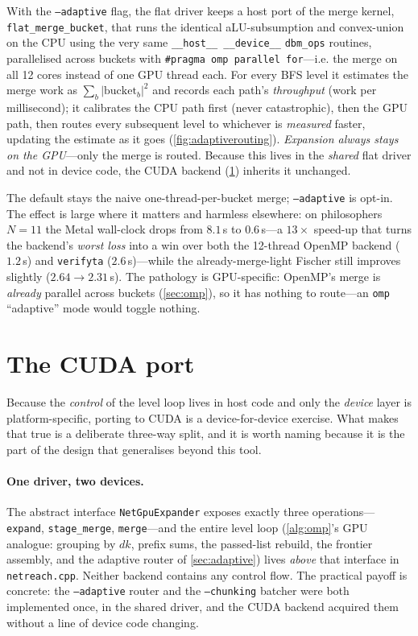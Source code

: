 \documentclass[11pt]{article}
\newcommand{\dk}{\ensuremath{\mathit{dk}}}
\newcommand{\code}[1]{\texttt{\small #1}}
\begin{document}
With the \code{--adaptive} flag, the flat driver keeps a host port of the merge kernel,
\code{flat\_merge\_bucket}, that runs the identical aLU-subsumption and convex-union on the CPU using
the very same \code{\_\_host\_\_ \_\_device\_\_} \code{dbm\_ops} routines, parallelised across buckets
with \code{\#pragma omp parallel for}---i.e. the merge on all 12 cores instead of one GPU thread each.
For every BFS level it estimates the merge work as $\sum_b |\mathrm{bucket}_b|^2$ and records each
path's \emph{throughput} (work per millisecond); it calibrates the CPU path first (never
catastrophic), then the GPU path, then routes every subsequent level to whichever is \emph{measured}
faster, updating the estimate as it goes (\cref{fig:adaptiverouting}). \emph{Expansion always stays on the GPU}---only the merge is
routed. Because this lives in the \emph{shared} flat driver and not in device code, the CUDA backend
(\cref{sec:cuda}) inherits it unchanged.

The default stays the naive one-thread-per-bucket merge; \code{--adaptive} is opt-in. The effect is
large where it matters and harmless elsewhere: on philosophers $N{=}11$ the Metal wall-clock drops
from $8.1$\,s to $0.6$\,s---a $13\times$ speed-up that turns the backend's \emph{worst loss} into a
win over both the 12-thread OpenMP backend ($1.2$\,s) and \code{verifyta} ($2.6$\,s)---while the
already-merge-light Fischer still improves slightly ($2.64\!\to\!2.31$\,s). The pathology is
GPU-specific: OpenMP's merge is \emph{already} parallel across buckets (\cref{sec:omp}), so it has
nothing to route---an \code{omp} ``adaptive'' mode would toggle nothing.

\section{The CUDA port}\label{sec:cuda}
Because the \emph{control} of the level loop lives in host code and only the \emph{device} layer is
platform-specific, porting to CUDA is a device-for-device exercise. What makes that true is a
deliberate three-way split, and it is worth naming because it is the part of the design that
generalises beyond this tool.

\paragraph{One driver, two devices.} The abstract interface \code{NetGpuExpander} exposes exactly
three operations---\code{expand}, \code{stage\_merge}, \code{merge}---and the entire level loop
(\cref{alg:omp}'s GPU analogue: grouping by $\dk$, prefix sums, the passed-list rebuild, the frontier
assembly, and the adaptive router of \cref{sec:adaptive}) lives \emph{above} that interface in
\code{netreach.cpp}. Neither backend contains any control flow. The practical payoff is concrete: the
\code{--adaptive} router and the \code{--chunking} batcher were both implemented once, in the shared
driver, and the CUDA backend acquired them without a line of device code changing.
\end{document}
